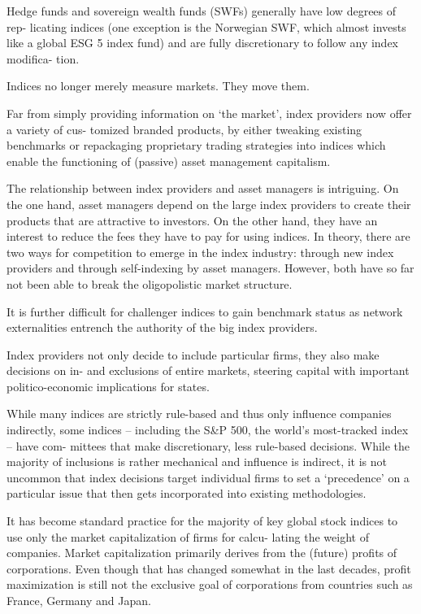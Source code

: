 \documentclass[
]{book}
\begin{document}
Hedge funds and sovereign wealth funds (SWFs) generally have low degrees of rep-
licating indices (one exception is the Norwegian SWF, which almost invests like a
global ESG 5 index fund) and are fully discretionary to follow any index modifica-
tion.

Indices no longer merely measure markets. They move them.

Far from simply
providing information on `the market', index providers now offer a variety of cus-
tomized branded products, by either tweaking existing benchmarks or repackaging
proprietary trading strategies into indices which enable the functioning of (passive)
asset management capitalism.

The relationship between index providers and asset managers is intriguing. On
the one hand, asset managers depend on the large index providers to create their
products that are attractive to investors. On the other hand, they have an interest
to reduce the fees they have to pay for using indices. In theory, there are two ways
for competition to emerge in the index industry: through new index providers and
through self-indexing by asset managers. However, both have so far not been able
to break the oligopolistic market structure.

It is further difficult for challenger indices to gain benchmark status as network
externalities entrench the authority of the big index providers.

Index providers not only decide to include particular firms, they
also make decisions on in- and exclusions of entire markets, steering capital with
important politico-economic implications for states.

While many indices are strictly rule-based and thus only influence companies indirectly,
some indices -- including the S\&P 500, the world's most-tracked index -- have com-
mittees that make discretionary, less rule-based decisions.
While the majority of inclusions is rather mechanical
and influence is indirect, it is not uncommon that index decisions target individual
firms to set a `precedence' on a particular issue that then gets incorporated into
existing methodologies.

It has become standard practice for the majority
of key global stock indices to use only the market capitalization of firms for calcu-
lating the weight of companies. Market capitalization primarily derives from the
(future) profits of corporations. Even though that has changed somewhat in the
last decades, profit maximization is still not the exclusive goal of corporations from
countries such as France, Germany and Japan.
\end{document}

